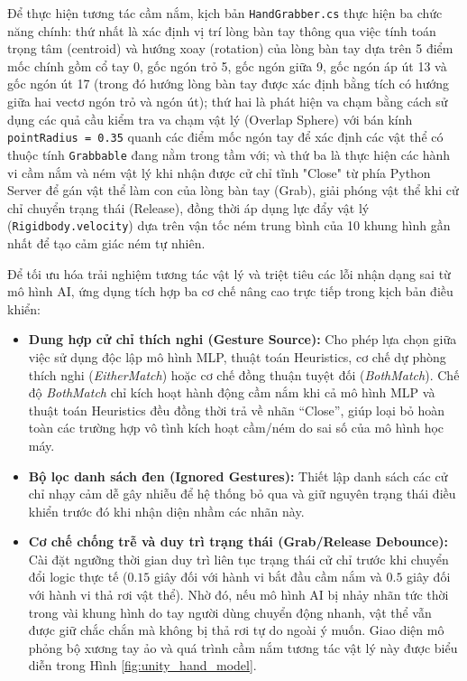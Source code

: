 \documentclass[../BTL.tex]{subfiles}
\begin{document}
Để thực hiện tương tác cầm nắm, kịch bản \texttt{HandGrabber.cs} thực hiện ba chức năng chính: thứ nhất là xác định vị trí lòng bàn tay thông qua việc tính toán trọng tâm (centroid) và hướng xoay (rotation) của lòng bàn tay dựa trên 5 điểm mốc chính gồm cổ tay 0, gốc ngón trỏ 5, gốc ngón giữa 9, gốc ngón áp út 13 và gốc ngón út 17 (trong đó hướng lòng bàn tay được xác định bằng tích có hướng giữa hai vectơ ngón trỏ và ngón út); thứ hai là phát hiện va chạm bằng cách sử dụng các quả cầu kiểm tra va chạm vật lý (Overlap Sphere) với bán kính \texttt{pointRadius = 0.35} quanh các điểm mốc ngón tay để xác định các vật thể có thuộc tính \texttt{Grabbable} đang nằm trong tầm với; và thứ ba là thực hiện các hành vi cầm nắm và ném vật lý khi nhận được cử chỉ tĩnh "Close" từ phía Python Server để gán vật thể làm con của lòng bàn tay (Grab), giải phóng vật thể khi cử chỉ chuyển trạng thái (Release), đồng thời áp dụng lực đẩy vật lý (\texttt{Rigidbody.velocity}) dựa trên vận tốc ném trung bình của 10 khung hình gần nhất để tạo cảm giác ném tự nhiên.

Để tối ưu hóa trải nghiệm tương tác vật lý và triệt tiêu các lỗi nhận dạng sai từ mô hình AI, ứng dụng tích hợp ba cơ chế nâng cao trực tiếp trong kịch bản điều khiển:
\begin{itemize}
    \item \textbf{Dung hợp cử chỉ thích nghi (Gesture Source):} Cho phép lựa chọn giữa việc sử dụng độc lập mô hình MLP, thuật toán Heuristics, cơ chế dự phòng thích nghi (\textit{EitherMatch}) hoặc cơ chế đồng thuận tuyệt đối (\textit{BothMatch}). Chế độ \textit{BothMatch} chỉ kích hoạt hành động cầm nắm khi cả mô hình MLP và thuật toán Heuristics đều đồng thời trả về nhãn ``Close'', giúp loại bỏ hoàn toàn các trường hợp vô tình kích hoạt cầm/ném do sai số của mô hình học máy.
    \item \textbf{Bộ lọc danh sách đen (Ignored Gestures):} Thiết lập danh sách các cử chỉ nhạy cảm dễ gây nhiễu để hệ thống bỏ qua và giữ nguyên trạng thái điều khiển trước đó khi nhận diện nhầm các nhãn này.
    \item \textbf{Cơ chế chống trễ và duy trì trạng thái (Grab/Release Debounce):} Cài đặt ngưỡng thời gian duy trì liên tục trạng thái cử chỉ trước khi chuyển đổi logic thực tế ($0.15$ giây đối với hành vi bắt đầu cầm nắm và $0.5$ giây đối với hành vi thả rơi vật thể). Nhờ đó, nếu mô hình AI bị nhảy nhãn tức thời trong vài khung hình do tay người dùng chuyển động nhanh, vật thể vẫn được giữ chắc chắn mà không bị thả rơi tự do ngoài ý muốn. Giao diện mô phỏng bộ xương tay ảo và quá trình cầm nắm tương tác vật lý này được biểu diễn trong Hình \ref{fig:unity_hand_model}.
\end{itemize}
\end{document}
